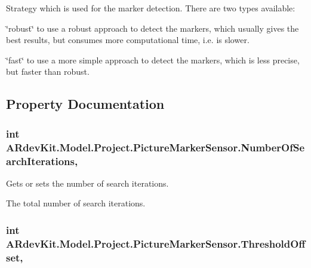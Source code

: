Strategy which is used for the marker detection. There are two types available\-: 


\begin{DoxyItemize}
\item \char`\"{}robust\char`\"{} to use a robust approach to detect the markers, which usually gives the best results, but consumes more computational time, i.\-e. is slower.
\item \char`\"{}fast\char`\"{} to use a more simple approach to detect the markers, which is less precise, but faster than robust. 
\end{DoxyItemize}

\subsection{Property Documentation}
\hypertarget{class_a_rdev_kit_1_1_model_1_1_project_1_1_picture_marker_sensor_abdebe622c6ef02494e50d0caa2b142cb}{
\subsubsection[{Number\-Of\-Search\-Iterations}]{\setlength{\rightskip}{0pt plus 5cm}int A\-Rdev\-Kit.\-Model.\-Project.\-Picture\-Marker\-Sensor.\-Number\-Of\-Search\-Iterations\hspace{0.3cm}{\ttfamily [get]}, {\ttfamily [set]}}}\label{class_a_rdev_kit_1_1_model_1_1_project_1_1_picture_marker_sensor_abdebe622c6ef02494e50d0caa2b142cb}


Gets or sets the number of search iterations. 

The total number of search iterations. \hypertarget{class_a_rdev_kit_1_1_model_1_1_project_1_1_picture_marker_sensor_a423bb9bb3fb7916fc9705640f58522e6}{
\subsubsection[{Threshold\-Offset}]{\setlength{\rightskip}{0pt plus 5cm}int A\-Rdev\-Kit.\-Model.\-Project.\-Picture\-Marker\-Sensor.\-Threshold\-Offset\hspace{0.3cm}{\ttfamily [get]}, {\ttfamily [set]}}}\label{class_a_rdev_kit_1_1_model_1_1_project_1_1_picture_marker_sensor_a423bb9bb3fb7916fc9705640f58522e6}


